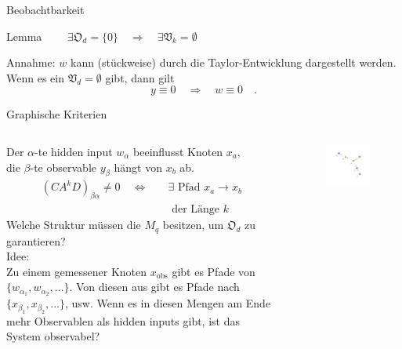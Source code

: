 \begin{frame}{Beobachtbarkeit}
	\begin{block}{Lemma}
	$\quad \quad \exists \mathfrak{O}_d=\{0\} \quad \Rightarrow \quad \exists \mathfrak{V}_k = \emptyset$
	\end{block}
	\pause
	Annahme: $w$ kann (stückweise) durch die Taylor-Entwicklung dargestellt werden.\\
	\pause
	Wenn es ein $\mathfrak{V}_d = \emptyset$ gibt, dann gilt
	\begin{equation}
	y\equiv 0 \quad \Longrightarrow \quad w\equiv 0 \quad .
	\end{equation}
\end{frame}

\begin{frame}{Graphische Kriterien} 
	\pause
	\begin{columns}[T]
	\begin{column}{.48\textwidth}
	Der $\alpha$-te hidden input $w_\alpha$ beeinflusst Knoten $x_a$, \\
	die $\beta$-te observable $y_\beta$ hängt von $x_b$ ab. \pause
	\begin{equation*}
	\begin{aligned}
	(CA^kD)_{\beta\alpha} \neq 0 \quad \Leftrightarrow \quad &\exists \text{ Pfad } x_a\to x_b \\ & \text{ der 
	Länge }k  
	\end{aligned}	
	\end{equation*}
	\pause
	Welche Struktur	müssen die $M_q$ besitzen, um
	$\mathfrak{O}_d$ zu garantieren?\\
	\pause
	\tiny{Idee:\\ Zu einem gemessener Knoten $x_\text{obs}$ gibt es Pfade von $\{w_{\alpha_1},w_{\alpha_2},
	\ldots\}$. Von diesen aus gibt es Pfade nach $\{x_{\beta_1},x_{\beta_2},\ldots\}$, usw. 
	Wenn es in diesen Mengen am Ende mehr Observablen als hidden inputs gibt, ist das System observabel? }
	\end{column}\hfill
	\begin{column}{.48\textwidth}
	\begin{figure}[h]
		\centering
		\includegraphics[scale=0.5]{bilder/Sufficient1_Graph.png}

\end{figure}
\end{column}
\end{columns}
\end{frame}
